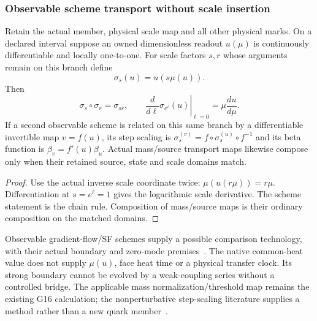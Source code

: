 \documentclass[12pt,a4paper]{article}
\begin{document}
\subsubsection{Observable scheme transport without scale insertion}
\begin{proposition}
\label{p10:prop:v2210-lit-observable-step-scaling}
Retain the actual member, physical scale map and all other physical marks.
On a declared interval suppose an owned dimensionless readout $u(\mu)$ is
continuously differentiable and locally one-to-one. For scale factors $s,r$
whose arguments remain on this branch define
\[
 \sigma_s(u)=u(s\mu(u)).
\]
Then
\[
 \boxed{\sigma_s\circ\sigma_r=\sigma_{sr},\qquad
 \left.\frac{d}{d\ell}\sigma_{e^\ell}(u)\right|_{\ell=0}
 =\mu\frac{du}{d\mu}.}
\]
If a second observable scheme is related on this same branch by a
differentiable invertible map $v=f(u)$, its step scaling is
$\sigma_s^{(v)}=f\circ\sigma_s^{(u)}\circ f^{-1}$ and its beta function is
$\beta_v=f'(u)\beta_u$. Actual mass/source transport maps likewise compose
only when their retained source, state and scale domains match.
\end{proposition}
\begin{proof}
Use the actual inverse scale coordinate twice:
$\mu(u(r\mu))=r\mu$. Differentiation at $s=e^\ell=1$ gives the logarithmic
scale derivative. The scheme statement is the chain rule. Composition of
mass/source maps is their ordinary composition on the matched domains.
\end{proof}
Observable gradient-flow/SF schemes supply a possible comparison technology,
with their actual boundary and zero-mode premises~\cite{LitQCDFritzschRamos2013GF}.
The native common-heat value does not supply $\mu(u)$, face heat time or a
physical transfer clock. Its strong boundary cannot be evolved by a
weak-coupling series without a controlled bridge. The applicable mass
normalization/threshold map remains the existing G16 calculation; the
nonperturbative step-scaling literature supplies a method rather than a
new quark member~\cite{LitQCDALPHA2018MassRunning}.


\end{document}

